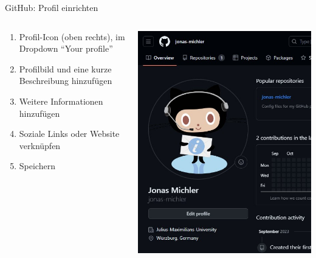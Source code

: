 \documentclass[compress,aspectratio=169]{beamer}
\begin{document}
	\begin{frame}{GitHub: Profil einrichten}
		\begin{columns}
			\begin{column}{0.6\textwidth}
				\begin{enumerate}
					\item Profil-Icon (oben rechts), im Dropdown ``Your profile''
					\item Profilbild und eine kurze Beschreibung hinzufügen
					\item Weitere Informationen hinzufügen
					\item Soziale Links oder Website verknüpfen
					\item Speichern
				\end{enumerate}
			\end{column}
			\begin{column}{0.35\textwidth}
				\includegraphics[width=\textwidth]{assets/github/your-profile.jpg}
			\end{column}
		\end{columns}
	\end{frame}
\end{document}
